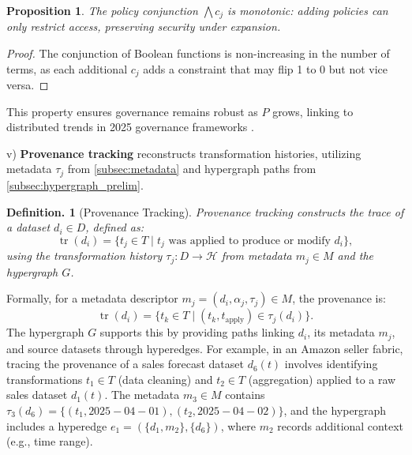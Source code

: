 \documentclass{amsart}
\newtheorem{prop}{Proposition}
\newtheorem{defn}[thm]{Definition.}
\DeclareMathOperator\tr{tr}
\begin{document}
\begin{prop} \label{prop:policy_monotonicity}
The policy conjunction \( \bigwedge c_j \) is monotonic: adding policies can only restrict access, preserving security under expansion.
\end{prop}

\begin{proof}
The conjunction of Boolean functions is non-increasing in the number of terms, as each additional \( c_j \) adds a constraint that may flip 1 to 0 but not vice versa.
\end{proof}

This property ensures governance remains robust as \( P \) grows, linking to distributed trends in 2025 governance frameworks \cite{dataversity2025trends}.


v) \textbf{Provenance tracking} reconstructs transformation histories, utilizing metadata \( \tau_j \) from \cref{subsec:metadata} and hypergraph paths from \cref{subsec:hypergraph_prelim}.

\begin{defn}[Provenance Tracking]
\label{provenance}
\emph{Provenance tracking} constructs the trace of a dataset \( d_i \in D \), defined as:
\[
\tr (d_i) = \{ t_j \in T \mid t_j \text{ was applied to produce or modify } d_i \},
\]
using the transformation history \( \tau_j: D \to \mathcal{H} \) from metadata \( m_j \in M \) and the hypergraph \( G \).
\end{defn}

Formally, for a metadata descriptor \( m_j = (d_i, \alpha_j, \tau_j) \in M \), the provenance is:
\[
\tr (d_i) = \{ t_k \in T \mid (t_k, t_{\text{apply}}) \in \tau_j(d_i) \}.
\]
The hypergraph \( G \) supports this by providing paths linking \( d_i \), its metadata \( m_j \), and source datasets through hyperedges. For example, in an Amazon seller fabric, tracing the provenance of a sales forecast dataset \( d_6(t) \) involves identifying transformations \( t_1 \in T \) (data cleaning) and \( t_2 \in T \) (aggregation) applied to a raw sales dataset \( d_1(t) \). The metadata \( m_3 \in M \) contains \( \tau_3(d_6) = \{(t_1, 2025-04-01), (t_2, 2025-04-02)\} \), and the hypergraph includes a hyperedge \( e_1 = (\{d_1, m_2\}, \{d_6\}) \), where \( m_2 \) records additional context (e.g., time range).
\end{document}
